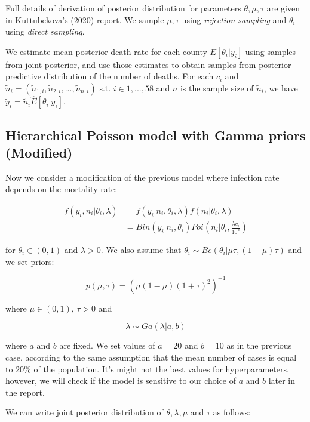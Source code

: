\documentclass[11pt,twocolumn]{asaproc}
\begin{document}
Full details of derivation of posterior distribution for parameters $\theta, \mu, \tau$ are given in Kuttubekova's (2020) report. We sample $\mu, \tau$ using \textit{rejection sampling} and $\theta_i$ using \textit{direct sampling}. 

We estimate mean posterior death rate for each county $E[\theta_i |y_i]$ using samples from joint posterior, and use those estimates to obtain samples from posterior predictive distribution of the number of deaths. For each $c_i$ and $\tilde{n}_i = (\tilde{n}_{1,i}, \tilde{n}_{2,i}, ..., \tilde{n}_{n,i})$ s.t. $i \in {1, ..., 58}$ and $n$ is the sample size of $\tilde{n}_i$, we have $\tilde{y}_i = \tilde{n}_i \hat{E}[\theta_i |y_i] $. 










\subsection{Hierarchical Poisson model with Gamma priors (Modified)}
Now we consider a modification of the previous model where infection rate depends on the mortality rate:

\begin{align*}
f(y_i, n_i|\theta_i, \lambda) & = f(y_i|n_i, \theta_i, \lambda)f(n_i|\theta_i, \lambda) \\
& = Bin(y_i|n_i, \theta_i)Poi(n_i|\theta_i, \frac{\lambda c_i}{10^3})
\end{align*}

for $\theta_i \in (0,1)$ and $\lambda>0$.  We also assume that $\theta_i \sim Be(\theta_i| \mu\tau, (1-\mu)\tau)$ and we set priors:

$$p(\mu, \tau) = (\mu(1-\mu)(1+\tau)^2)^{-1}$$ 

where $\mu \in (0,1)$, $\tau>0$ and 

$$\lambda \sim Ga(\lambda|a, b)$$

where $a$ and $b$ are fixed. We set values of $a = 20$ and $b = 10$ as in the previous case, according to the same assumption that the mean number of cases is equal to 20\% of the population. It's might not the best values for hyperparameters, however, we will check if the model is sensitive to our choice of $a$ and $b$ later in the report.


We can write joint posterior distribution of $\theta, \lambda, \mu$ and $\tau$ as follows:
\end{document}
